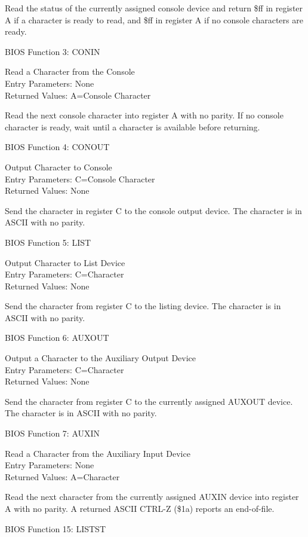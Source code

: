 Read the status of the currently assigned console device and return
\$ff in register A if a character is ready to read, and \$ff in
register A if no console characters are ready.

BIOS Function 3: CONIN

Read a Character from the Console\\
Entry Parameters: None\\
Returned Values: A=Console Character

Read the next console character into register A with no parity. If no
console character is ready, wait until a character is available before
returning.

BIOS Function 4: CONOUT

Output Character to Console\\
Entry Parameters: C=Console Character\\
Returned Values: None

Send the character in register C to the console output device. The
character is in ASCII with no parity.

BIOS Function 5: LIST

Output Character to List Device\\
Entry Parameters: C=Character\\
Returned Values: None

Send the character from register C to the listing device. The
character is in ASCII with no parity.

BIOS Function 6: AUXOUT

Output a Character to the Auxiliary Output Device\\
Entry Parameters: C=Character\\
Returned Values: None

Send the character from register C to the currently assigned AUXOUT
device. The character is in ASCII with no parity.

BIOS Function 7: AUXIN

Read a Character from the Auxiliary Input Device\\
Entry Parameters: None\\
Returned Values: A=Character

Read the next character from the currently assigned AUXIN device into
register A with no parity. A returned ASCII CTRL-Z (\$1a) reports an
end-of-file.

BIOS Function 15: LISTST

